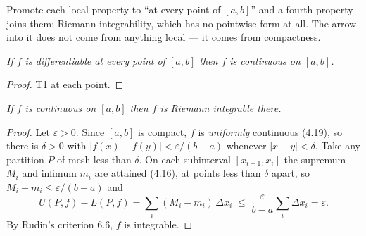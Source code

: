 
\begin{signpost}
Promote each local property to ``at every point of $[a,b]$'' and a fourth
property joins them: Riemann integrability, which has no pointwise form at
all. The arrow into it does not come from anything local --- it comes from
compactness.
\end{signpost}

\emph{If $f$ is differentiable at every point of $[a,b]$ then $f$ is
continuous on $[a,b]$.}

\begin{proof}
T1 at each point.
\end{proof}

\emph{If $f$ is continuous on $[a,b]$ then $f$ is Riemann integrable there.}

\begin{proof}
Let $\varepsilon>0$. Since $[a,b]$ is compact, $f$ is \emph{uniformly}
continuous (4.19), so there is $\delta>0$ with
$|f(x)-f(y)| < \varepsilon/(b-a)$ whenever $|x-y|<\delta$. Take any partition
$P$ of mesh less than $\delta$. On each subinterval $[x_{i-1},x_i]$ the
supremum $M_i$ and infimum $m_i$ are attained (4.16), at points less than
$\delta$ apart, so $M_i - m_i \le \varepsilon/(b-a)$ and
\[ U(P,f) - L(P,f) = \sum_i (M_i-m_i)\,\Delta x_i
   \;\le\; \frac{\varepsilon}{b-a}\sum_i \Delta x_i = \varepsilon . \]
By Rudin's criterion 6.6, $f$ is integrable.
\end{proof}

